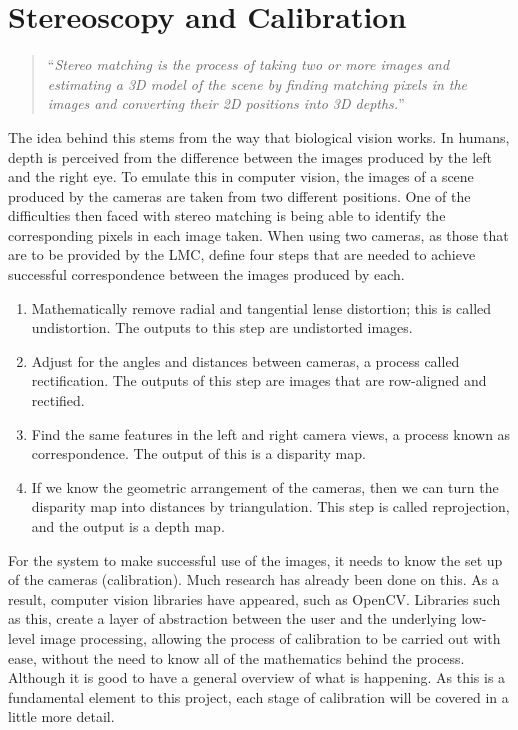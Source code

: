 \documentclass[11pt,oneside]{report}
\begin{document}
			\section{Stereoscopy and Calibration}
			\begin{quote}
				``\textit{Stereo matching is the process of taking two or more images and estimating a 3D model of the scene by finding matching pixels in the images and converting their 2D positions into 3D depths.}''\cite{book:sam}
			\end{quote}
			The idea behind this stems from the way that biological vision works.
			In humans, depth is perceived from the difference between the images produced by the left and the right eye.
			To emulate this in computer vision, the images of a scene produced by the cameras are taken from two different positions.
			One of the difficulties then faced with stereo matching is being able to identify the corresponding pixels in each image taken.
			When using two cameras, as those that are to be provided by the LMC,  define four steps that are needed to achieve successful correspondence between the images produced by each.
			
			\begin{enumerate}
				\item Mathematically remove radial and tangential lense distortion; this is called undistortion. The outputs to this step are undistorted images.
				
				\item Adjust for the angles and distances between cameras, a process called rectification. The outputs of this step are images that are row-aligned and rectified.
				
				\item Find the same features in the left and right camera views, a process known as correspondence. The output of this is a disparity map.
								
				\item If we know the geometric arrangement of the cameras, then we can turn the disparity map into distances by triangulation. This step is called reprojection, and the output is a depth map.
			\end{enumerate}
			
			For the system to make successful use of the images, it needs to know the set up of the cameras (calibration).
			Much research has already been done on this.
			As a result, computer vision libraries have appeared, such as OpenCV.
			Libraries such as this, create a layer of abstraction between the user and the underlying low-level image processing, allowing the process of calibration to be carried out with ease, without the need to know all of the mathematics behind the process.
			Although it is good to have a general overview of what is happening.
			As this is a fundamental element to this project, each stage of calibration will be covered in a little more detail.
\end{document}
